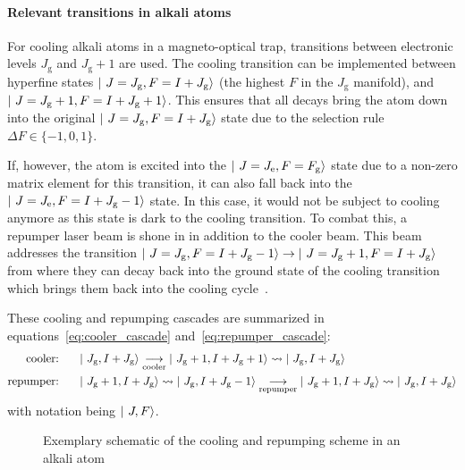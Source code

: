 \paragraph{Relevant transitions in alkali atoms}
\sloppy For cooling alkali atoms in a magneto-optical trap, transitions between electronic levels $J_\text{g}$ and $J_\text{g} + 1$ are used. The cooling transition can be imple\-mented between hyperfine states $\Ket{~J = J_\text{g}, F = I + J_\text{g}}$ (the highest $F$ in the $J_\text{g}$ manifold), and $\Ket{~J = J_\text{g} + 1, F= I + J_\text{g} + 1}$. This ensures that all decays bring the atom down into the original $\Ket{~J = J_\text{g}, F = I + J_\text{g}}$ state due to the selection rule $\Delta F \in \{-1, 0, 1\}$.

If, however, the atom is excited into the $\Ket{~J = J_\text{e}, F = F_\text{g}}$ state due to a non-zero matrix element for this transition, it can also fall back into the $\Ket{~J = J_\text{e}, F = I + J_\text{g} - 1}$ state. In this case, it would not be subject to cooling anymore as this state is dark to the cooling transition. To combat this, a repumper laser beam is shone in in addition to the cooler beam. This beam addresses the transition $\Ket{~J = J_\text{g}, F = I + J_\text{g} - 1} \rightarrow \Ket{~J = J_\text{g} + 1, F = I + J_\text{g}}$ from where they can decay back into the ground state of the cooling transition which brings them back into the cooling cycle~\cite{metcalf_laser_1999}.

These cooling and repumping cascades are summarized in equations~\eqref{eq:cooler_cascade} and~\eqref{eq:repumper_cascade}:
\begin{align}
    \label{eq:cooler_cascade}\text{cooler:}~~~~~ & \Ket{~J_\text{g},I + J_\text{g}} \underset{\text{cooler}}{\longrightarrow} \Ket{~J_\text{g} + 1, I + J_\text{g} + 1} \rightsquigarrow  \Ket{~J_\text{g}, I + J_\text{g}}\\
    \label{eq:repumper_cascade}\text{repumper:}~~~~~ & \Ket{~J_\text{g} + 1, I + J_\text{g}} \rightsquigarrow \Ket{~J_\text{g}, I + J_\text{g} - 1}  \underset{\text{repumper}}{\longrightarrow} \Ket{~J_\text{g} + 1, I + J_\text{g}} \rightsquigarrow  \Ket{~J_\text{g}, I + J_\text{g}}
\end{align}
with notation being $\Ket{~J, F}$.

\begin{figure}
    \caption{Exemplary schematic of the cooling and repumping scheme in an alkali atom}\label{fig:cooler_repumper_in_alkali}
\end{figure}


